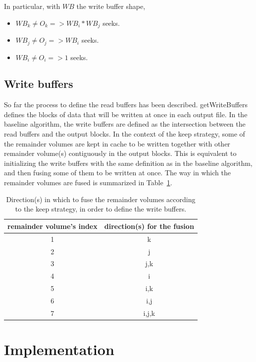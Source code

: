 \documentclass[sigconf, nonacm]{acmart}
\begin{document}
In particular, with $WB$ the write buffer shape,
\begin{itemize}
  \item $WB_k \neq O_k => WB_i*WB_j$ seeks.
  \item $WB_j \neq O_j => WB_i$ seeks.
  \item $WB_i \neq O_i => 1$ seeks.
\end{itemize}

\subsection{Write buffers}
So far the process to define the read buffers has been described.
getWriteBuffers defines the blocks of data that will be written at once in each
output file.
In the baseline algorithm, the write buffers are defined as the
intersection between the read buffers and the output blocks.
In the context of the keep strategy, some of the remainder volumes are kept in cache
to be written together with other remainder volume(s) contiguously in the output
blocks.
This is equivalent to initializing the write buffers with the same definition as
in the baseline algorithm, and then fusing some of them to be written at once.
The way in which the remainder volumes are fused is summarized in
Table~\ref{tab:fusion}.

\begin{table}[ht]
  \centering
  \caption{Direction(s) in which to fuse the remainder volumes according to the keep strategy, in order to define the write buffers.}

   \begin{tabular}[t]{ | c | c | }
   \hline
   remainder volume's index & direction(s) for the fusion \\
     \hline\hline
     1 & k \\
     \hline
     2 & j \\
     \hline
     3 & j,k \\
     \hline
     4 & i \\
     \hline
     5 & i,k \\
     \hline
     6 & i,j \\
     \hline
     7 & i,j,k \\
     \hline
   \end{tabular}

   \label{tab:fusion}

\end{table}

\section{Implementation}
\end{document}
